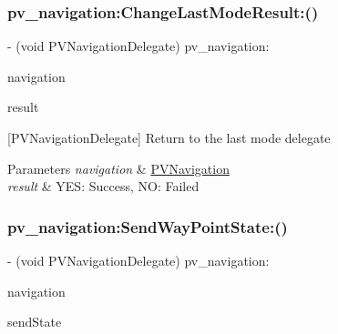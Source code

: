\subsubsection{\texorpdfstring{pv\+\_\+navigation\+:\+Change\+Last\+Mode\+Result\+:()}{pv\_navigation:ChangeLastModeResult:()}}
{\footnotesize\ttfamily -\/ (void P\+V\+Navigation\+Delegate) pv\+\_\+navigation\+: \begin{DoxyParamCaption}\item[{(\hyperlink{interface_p_v_navigation}{P\+V\+Navigation} $\ast$)}]{navigation }\item[{ChangeLastModeResult:(B\+O\+OL)}]{result }\end{DoxyParamCaption}\hspace{0.3cm}{\ttfamily [optional]}}

\mbox{[}P\+V\+Navigation\+Delegate\mbox{]} Return to the last mode delegate


\begin{DoxyParams}{Parameters}
{\em navigation} & \hyperlink{interface_p_v_navigation}{P\+V\+Navigation} \\
\hline
{\em result} & Y\+ES\+: Success, NO\+: Failed \\
\hline
\end{DoxyParams}
\mbox{\label{protocol_p_v_navigation_delegate_01-p_a10e0f7b763f0f32e039a26f80bce4e40}} 
\subsubsection{\texorpdfstring{pv\+\_\+navigation\+:\+Send\+Way\+Point\+State\+:()}{pv\_navigation:SendWayPointState:()}}
{\footnotesize\ttfamily -\/ (void P\+V\+Navigation\+Delegate) pv\+\_\+navigation\+: \begin{DoxyParamCaption}\item[{(\hyperlink{interface_p_v_navigation}{P\+V\+Navigation} $\ast$)}]{navigation }\item[{SendWayPointState:(P\+V\+Way\+Point\+Send\+State)}]{send\+State }\end{DoxyParamCaption}\hspace{0.3cm}{\ttfamily [optional]}}

